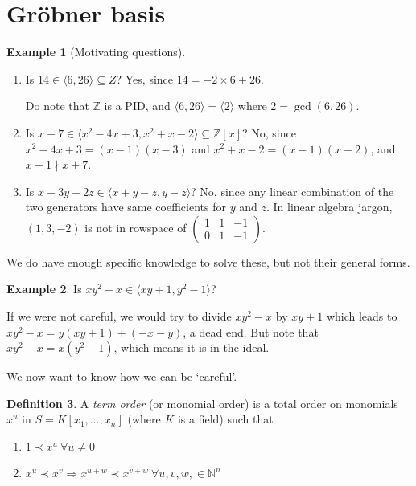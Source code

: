 \documentclass[a4paper]{article}
\newcommand{\la}{\langle}
\newcommand{\ra}{\rangle}
\newcommand{\Z}{\mathbb Z}
\theoremstyle{definition}
\newtheorem{defn}{Definition}[subsection]
\newtheorem{example}[defn]{Example}
\begin{document}
\section{Gröbner basis}
\begin{example}[Motivating questions]
\begin{enumerate}
\item Is $14\in \la 6,26\ra \subseteq Z$? Yes, since $14=-2\times 6+26$.

Do note that $\Z$ is a PID, and $\la 6,26\ra=\la 2 \ra$ where $2=\gcd(6,26)$.
\item Is $x+7\in \la x^2-4x+3, x^2+x-2\ra \subseteq \Z[x]$? No, since $x^2-4x+3=(x-1)(x-3)$ and $x^2+x-2=(x-1)(x+2)$, and $x-1\nmid x+7$.
\item Is $x+3y-2z \in \la x+y-z, y-z\ra$? No, since any linear combination of the two generators have same coefficients for $y$ and $z$. In linear algebra jargon, $(1,3,-2)$ is not in rowspace of $\begin{pmatrix}1 & 1 & -1 \\ 0 & 1 & -1 \end{pmatrix}$.
\end{enumerate}
We do have enough specific knowledge to solve these, but not their general forms.
\end{example}
\begin{example}
Is $xy^2-x\in \la xy+1,y^2-1\ra$?

If we were not careful, we would try to divide $xy^2-x$ by $xy+1$ which leads to $xy^2-x=y(xy+1)+(-x-y)$, a dead end. But note that $xy^2-x=x(y^2-1)$, which means it is in the ideal.

We now want to know how we can be `careful'.
\end{example}
\begin{defn}
A \textit{term order} (or monomial order) is a total order on monomials $x^u$ in $S=K[x_1,\ldots,x_n]$ (where $K$ is a field) such that
\begin{enumerate}
\item $1\prec x^u \ \forall u\neq 0$
\item $x^u\prec x^v \Rightarrow x^{u+w}\prec  x^{v+w} \ \forall u,v,w,\in \mathbb N^n$
\end{enumerate}
\end{defn}
\end{document}
